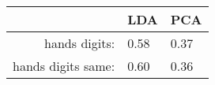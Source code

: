 \begin{tabular}{|r|l|l|}
  \hline
    & LDA & PCA \\
  \hline
  hands digits: & 0.58 & 0.37 \\
  \hline
  hands digits same: & 0.60 & 0.36 \\
  \hline
\end{tabular}
